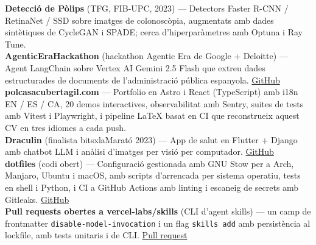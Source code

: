 
\begin{cvparagraph}
    \textbf{Detecció de Pòlips} (TFG, FIB-UPC, 2023) --- Detectors Faster R-CNN / RetinaNet / SSD sobre imatges de colonoscòpia, augmentats amb dades sintètiques de CycleGAN i SPADE; cerca d'hiperparàmetres amb Optuna i Ray Tune. \\
    \textbf{AgenticEraHackathon} (hackathon Agentic Era de Google + Deloitte) --- Agent LangChain sobre Vertex AI Gemini 2.5 Flash que extreu dades estructurades de documents de l'administració pública espanyola. \href{https://github.com/cuberhaus/AgenticEraHackathon}{GitHub} \\
    \textbf{polcasacubertagil.com} --- Portfolio en Astro i React (TypeScript) amb i18n EN / ES / CA, 20 demos interactives, observabilitat amb Sentry, suites de tests amb Vitest i Playwright, i pipeline LaTeX basat en CI que reconstrueix aquest CV en tres idiomes a cada push. \\
    \textbf{Draculin} (finalista bitsxlaMarató 2023) --- App de salut en Flutter + Django amb chatbot LLM i anàlisi d'imatges per visió per computador. \href{https://github.com/cuberhaus/Draculin-Backend}{GitHub} \\
    \textbf{dotfiles} (codi obert) --- Configuració gestionada amb GNU Stow per a Arch, Manjaro, Ubuntu i macOS, amb scripts d'arrencada per sistema operatiu, tests en shell i Python, i CI a GitHub Actions amb linting i escaneig de secrets amb Gitleaks. \href{https://github.com/cuberhaus/dotfiles}{GitHub} \\
    \textbf{Pull requests obertes a vercel-labs/skills} (CLI d'agent skills) --- un camp de frontmatter \texttt{disable-model-invocation} i un flag \texttt{skills add} amb persistència al lockfile, amb tests unitaris i de CLI. \href{https://github.com/vercel-labs/skills/pull/2498}{Pull request}
\end{cvparagraph}
